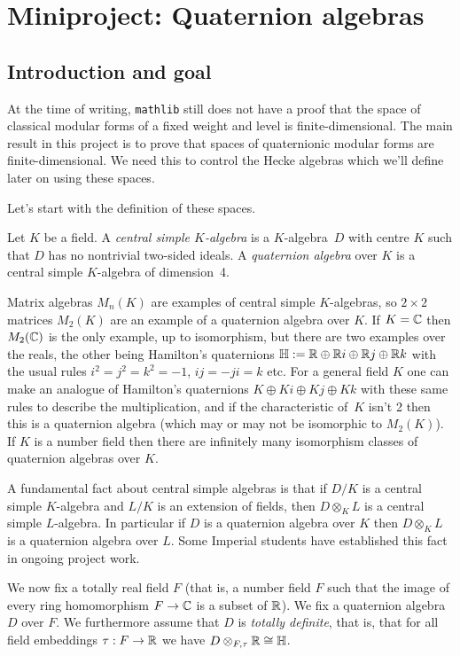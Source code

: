 \chapter{Miniproject: Quaternion algebras}\label{Quat_alg_project}

\section{Introduction and goal}

At the time of writing, {\tt mathlib} still does not have a proof that the space
of classical modular forms of a fixed weight and level is finite-dimensional. The main result
in this project is to prove that spaces of quaternionic modular forms are
finite-dimensional. We need this to control the Hecke algebras which we'll define
later on using these spaces.

Let's start with the definition of these spaces.

Let $K$ be a field. A \emph{central simple $K$-algebra} is a $K$-algebra~$D$ with
centre $K$ such that $D$ has no nontrivial two-sided ideals. A \emph{quaternion algebra}
over $K$ is a central simple $K$-algebra of dimension~4.

Matrix algebras $M_n(K)$ are examples of central simple $K$-algebras, so
$2\times 2$ matrices $M_2(K)$ are an example of a quaternion algebra over $K$.
If $K=\mathbb{C}$ then $M_2(\mathbb{C})$ is the only example, up to isomorphism, but there are
two examples over the reals, the other being Hamilton's quaternions
$\mathbb{H}:=\mathbb{R}\oplus\mathbb{R} i\oplus\mathbb{R} j\oplus\mathbb{R} k$ with the usual rules $i^2=j^2=k^2=-1$,
$ij=-ji=k$ etc. For a general field $K$ one can make an analogue of Hamilton's
quaternions $K\oplus Ki\oplus Kj\oplus Kk$ with these same rules to describe the
multiplication, and if the characteristic of~$K$ isn't 2 then this is a quaternion algebra
(which may or may not be isomorphic to $M_2(K)$). If $K$ is a number field then there are
infinitely many isomorphism classes of quaternion algebras over $K$.

A fundamental fact about central simple algebras is that if $D/K$
is a central simple $K$-algebra and $L/K$ is an extension of fields, then $D\otimes_KL$
is a central simple $L$-algebra. In particular if $D$ is a quaternion algebra over $K$
then $D\otimes_KL$ is a quaternion algebra over $L$. Some Imperial students have established
this fact in ongoing project work.

We now fix a totally real field $F$ (that is, a number field $F$ such that the image of every ring
homomorphism $F\to\mathbb{C}$ is a subset of $\mathbb{R}$). We fix a quaternion algebra $D$ over $F$. We
furthermore assume that $D$ is \emph{totally definite}, that is, that for all field embeddings
$\tau:F\to\mathbb{R}$ we have $D\otimes_{F,\tau}\mathbb{R}\cong\mathbb{H}$.

